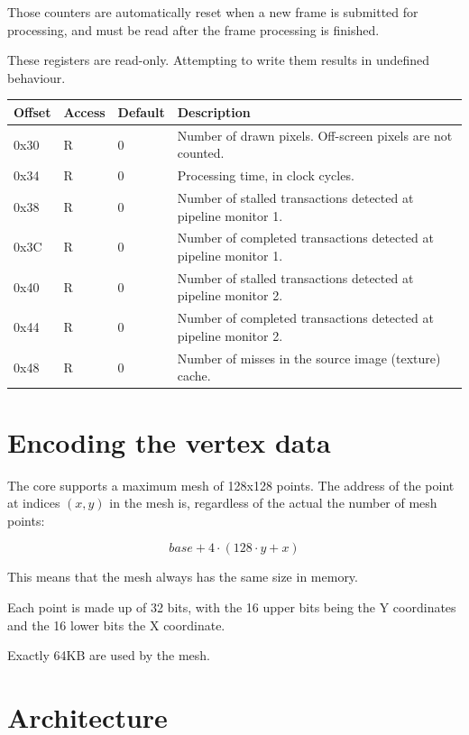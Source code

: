 \documentclass[a4paper,11pt]{article}
\begin{document}
Those counters are automatically reset when a new frame is submitted for processing, and must be read after the frame processing is finished.

These registers are read-only. Attempting to write them results in undefined behaviour.

\begin{tabular}{|l|l|l|p{10.5cm}|}
\hline
\bf{Offset} & \bf{Access} & \bf{Default} & \bf{Description} \\
\hline
0x30 & R & 0 & Number of drawn pixels. Off-screen pixels are not counted. \\
\hline
0x34 & R & 0 & Processing time, in clock cycles. \\
\hline
0x38 & R & 0 & Number of stalled transactions detected at pipeline monitor 1. \\
\hline
0x3C & R & 0 & Number of completed transactions detected at pipeline monitor 1. \\
\hline
0x40 & R & 0 & Number of stalled transactions detected at pipeline monitor 2. \\
\hline
0x44 & R & 0 & Number of completed transactions detected at pipeline monitor 2. \\
\hline
0x48 & R & 0 & Number of misses in the source image (texture) cache. \\
\hline
\end{tabular}

\section{Encoding the vertex data}
The core supports a maximum mesh of 128x128 points. The address of the point at indices $ (x, y) $ in the mesh is, regardless of the actual the number of mesh points:

\begin{equation*}
base + 4 \cdot (128 \cdot y + x)
\end{equation*}

This means that the mesh always has the same size in memory.

Each point is made up of 32 bits, with the 16 upper bits being the Y coordinates and the 16 lower bits the X coordinate.

Exactly 64KB are used by the mesh.

\section{Architecture}
\end{document}
